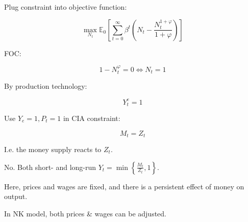 {\begin{enumerate}[label=(\alph*)]
{Plug constraint into objective function:

$$
\max _{N_{t}} \mathbb{E}_{0}\left[\sum_{t=0}^{\infty} \beta^{t}\left(N_{t}-\frac{N_{t}^{1+\varphi}}{1+\varphi}\right)\right]
$$

FOC:

$$
1-N_{t}^{\varphi}=0 \Leftrightarrow N_{t}=1
$$

By production technology:

$$
Y_{t}^{e}=1
$$

Use $Y_{e}=1, P_{t}=1$ in CIA constraint:

$$
M_{t}=Z_{t}
$$

I.e. the money supply reacts to $Z_t$.
}
{
\item 
No. Both short- and long-run $Y_{t}=\min \left\{\frac{M_{t}}{Z_{t}}, 1\right\}$.

Here, prices and wages are fixed, and there is a persistent effect of money on output.

In NK model, both prices \& wages can be adjusted.
}
\end{enumerate}
}
